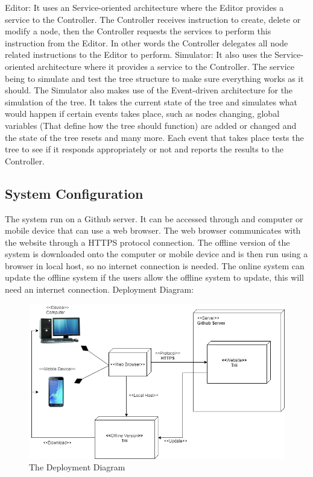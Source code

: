 \documentclass[12pt]{article}
\begin{document}
    Editor: It uses an Service-oriented architecture where the Editor provides a service to the Controller. The Controller receives instruction to create, delete or modify a node, then the Controller requests the services to perform this instruction from the Editor. In other words the Controller delegates all node related instructions to the Editor to perform.\newline \newline 
    Simulator: It also uses the Service-oriented architecture where it provides a service to the Controller. The service being to simulate and test the tree structure to make sure everything works as it should. The Simulator also makes use of the Event-driven architecture for the simulation of the tree. It takes the current state of the tree and simulates what would happen if certain events takes place, such as nodes changing, global variables (That define how the tree should function) are added or changed and the state of the tree resets and many more. Each event that takes place tests the tree to see if it responds appropriately or not and reports the results to the Controller.

  \subsection{System Configuration} 
    The system run on a Github server. It can be accessed through and computer or mobile device that can use a web browser. The web browser communicates with the website through a HTTPS protocol connection. The offline version of the system is downloaded onto the computer or mobile device and is then run using a browser in local host, so no internet connection is needed. The online system can update the offline system if the users allow the offline system to update, this will need an internet connection.\newline \newline 
    Deployment Diagram:
    
    \begin{figure}[H]
      \includegraphics[width=\linewidth]{TriiDeploymentDiagram}
      \caption{The Deployment Diagram}
      \label{fig:deploymentdiagram}
    \end{figure}
\end{document}
